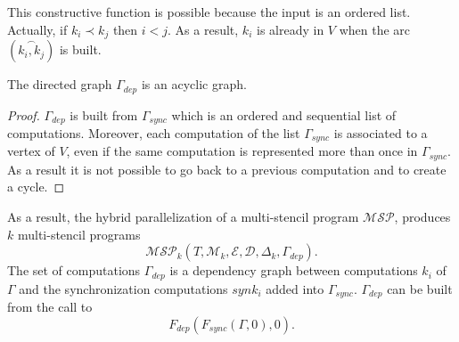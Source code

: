 This constructive function is possible because the input is an ordered list. Actually, if $k_i\prec k_j$ then $i<j$. As a result, $k_i$ is already in $V$ when the arc $(\overset{\frown}{k_i,k_j})$ is built. 

\begin{myprop}
The directed graph $\Gamma_{dep}$ is an acyclic graph.
\end{myprop}

\begin{proof}
$\Gamma_{dep}$ is built from $\Gamma_{sync}$ which is an ordered and sequential list of computations. Moreover, each computation of the list $\Gamma_{sync}$ is associated to a vertex of $V$, even if the same computation is represented more than once in $\Gamma_{sync}$. As a result it is not possible to go back to a previous computation and to create a cycle.
\end{proof}

As a result, the hybrid parallelization of a multi-stencil program $\mathcal{MSP}$, produces $k$ multi-stencil programs
\begin{equation*}
\mathcal{MSP}_k(T,\mathcal{M}_k,\mathcal{E},\mathcal{D},\Delta_k,\Gamma_{dep}).
\end{equation*}
The set of computations $\Gamma_{dep}$ is a dependency graph between computations $k_i$ of $\Gamma$ and the synchronization computations $synk_i$ added into $\Gamma_{sync}$. $\Gamma_{dep}$ can be built from the call to 
\begin{equation*}
F_{dep}(F_{sync}(\Gamma,0),0).
\end{equation*}



